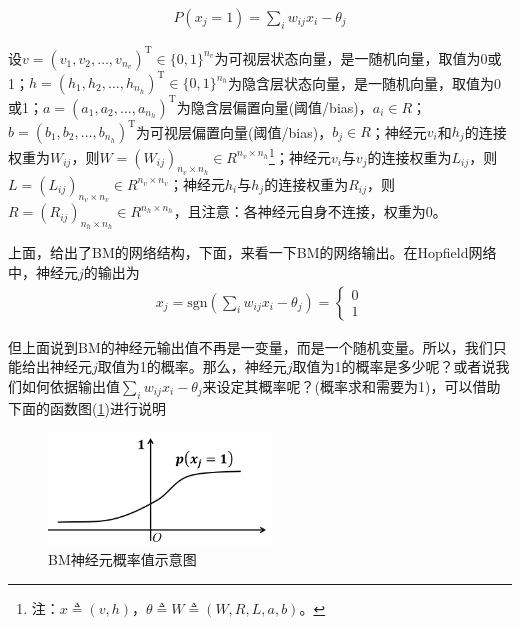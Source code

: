 {            \begin{align*}
            P(x_j = 1) = \sum_i w_{ij}x_i - \theta_j
            \end{align*}
            \par
            设$v = (v_1,v_2,\dots,v_{n_v})^\mathrm{T} \in \{0,1\}^{n_v}$为可视层状态向量，是一随机向量，取值为0或1；$h = (h_1,h_2,\dots,h_{n_h})^\mathrm{T} \in \{0,1\}^{n_h}$为隐含层状态向量，是一随机向量，取值为0或1；$a = (a_1,a_2,\dots,a_{n_h})^\mathrm{T}$为隐含层偏置向量(阈值/bias)，$a_i\in R$；$b = (b_1,b_2,\dots,b_{n_h})^\mathrm{T}$为可视层偏置向量(阈值/bias)，$b_j\in R$；神经元$v_i$和$h_j$的连接权重为$W_{ij}$，则$W = (W_{ij})_{n_v\times n_h}\in R^{n_v\times n_h}$\footnote{注：$x \triangleq (v,h)$，$\theta \triangleq W \triangleq (W,R,L,a,b)$。}；神经元$v_i$与$v_j$的连接权重为$L_{ij}$，则$L = (L_{ij})_{n_v\times n_v}\in R^{n_v\times n_v}$；神经元$h_i$与$h_j$的连接权重为$R_{ij}$，则$R = (R_{ij})_{n_h\times n_h}\in R^{n_h\times n_h}$，且注意：各神经元自身不连接，权重为0。
            \par
            上面，给出了BM的网络结构，下面，来看一下BM的网络输出。在Hopfield网络中，神经元$j$的输出为
            \begin{align*}
            x_j = \mathrm{sgn} \left( \sum_{i} w_{ij}x_i - \theta_j \right)  =
            \left\{
            \begin{aligned}
            0\\
            1
            \end{aligned}
            \right.
            \end{align*}
            \par
            但上面说到BM的神经元输出值不再是一变量，而是一个随机变量。所以，我们只能给出神经元$j$取值为1的概率。那么，神经元$j$取值为1的概率是多少呢？或者说我们如何依据输出值$\sum_{i} w_{ij}x_i - \theta_j $来设定其概率呢？(概率求和需要为1)，可以借助下面的函数图(\ref{fig:BM神经元概率值示意图})进行说明
            \begin{figure}[H]
            \centering
            \includegraphics[height=3cm]{images/BM_neuron_probability_values.jpg}
            \caption{BM神经元概率值示意图}
            \label{fig:BM神经元概率值示意图}

\end{figure}}
